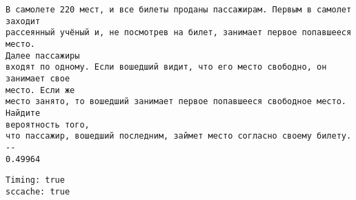 \documentclass[11pt]{article}
\makeatletter
\newcommand{\boxspacing}{\kern\kvtcb@left@rule\kern\kvtcb@boxsep}
\newcommand{\prompt}[4]{
        {\ttfamily\llap{{\color{#2}[#3]:\hspace{3pt}#4}}\vspace{-\baselineskip}}
    }
\makeatother
\begin{document}
    \begin{Verbatim}[commandchars=\\\{\}]
В самолете 220 мест, и все билеты проданы пассажирам. Первым в самолет заходит
рассеянный учёный и, не посмотрев на билет, занимает первое попавшееся место.
Далее пассажиры
входят по одному. Если вошедший видит, что его место свободно, он занимает свое
место. Если же
место занято, то вошедший занимает первое попавшееся свободное место. Найдите
вероятность того,
что пассажир, вошедший последним, займет место согласно своему билету. --
0.49964
    \end{Verbatim}

            \begin{tcolorbox}[breakable, size=fbox, boxrule=.5pt, pad at break*=1mm, opacityfill=0]
\prompt{Out}{outcolor}{8}{\boxspacing}
\begin{Verbatim}[commandchars=\\\{\}]
Timing: true
sccache: true

\end{Verbatim}
\end{tcolorbox}
        
\end{document}
